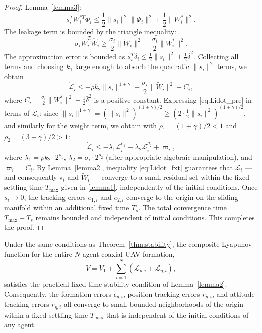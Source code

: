\begin{proof}
Lemma~\ref{lemma3}:
\begin{equation}
    s_i^T W_i^{*T} \Phi_i \leq \frac{1}{2}\|s_i\|^2 \|\Phi_i\|^2
    + \frac{1}{2}\|W_i^*\|^2.
    \label{eq:young_nn}
\end{equation}
The leakage term is bounded by the triangle inequality:
\begin{equation}
    \sigma_i \tilde{W}_i^T \hat{W}_i
    \geq \frac{\sigma_i}{2}\|\tilde{W}_i\|^2 - \frac{\sigma_i}{2}\|W_i^*\|^2.
    \label{eq:leakage}
\end{equation}
The approximation error is bounded as $s_i^T \delta_i \leq \frac{1}{2}\|s_i\|^2
+ \frac{1}{2}\bar{\delta}^2$. Collecting all terms and choosing $k_1$ large
enough to absorb the quadratic $\|s_i\|^2$ terms, we obtain
\begin{equation}
    \dot{\mathcal{L}}_i \leq
    -\underline{\rho} k_2 \|s_i\|^{1+\gamma}
    - \frac{\sigma_i}{2}\|\tilde{W}_i\|^2 + C_i,
    \label{eq:Lidot_pre}
\end{equation}
where $C_i = \frac{\sigma_i}{2}\|W_i^*\|^2 + \frac{1}{2}\bar{\delta}^2$ is a
positive constant. Expressing \eqref{eq:Lidot_pre} in terms of $\mathcal{L}_i$:
since $\|s_i\|^{1+\gamma} = (\|s_i\|^2)^{(1+\gamma)/2} \geq
(2 \cdot \frac{1}{2}\|s_i\|^2)^{(1+\gamma)/2}$, and similarly for the weight
term, we obtain with $\rho_1 = (1+\gamma)/2 < 1$ and $\rho_2 = (3-\gamma)/2 > 1$:
\begin{equation}
    \dot{\mathcal{L}}_i \leq
    -\lambda_1 \mathcal{L}_i^{\rho_1}
    - \lambda_2 \mathcal{L}_i^{\rho_2} + \varpi_i,
    \label{eq:Lidot_fxt}
\end{equation}
where $\lambda_1 = \underline{\rho} k_2 \cdot 2^{\rho_1}$,
$\lambda_2 = \sigma_i \cdot 2^{\rho_2}$ (after appropriate algebraic
manipulation), and $\varpi_i = C_i$. By Lemma~\ref{lemma2}, inequality
\eqref{eq:Lidot_fxt} guarantees that $\mathcal{L}_i$ — and consequently
$s_i$ and $\tilde{W}_i$ — converge to a small residual set within the fixed
settling time $T_{\max}$ given in \eqref{lemma1}, independently of the initial
conditions. Once $s_i \to 0$, the tracking errors $e_{1,i}$ and $e_{2,i}$
converge to the origin on the sliding manifold within an additional fixed time
$T_s$. The total convergence time $T_{\max} + T_s$ remains bounded and
independent of initial conditions. This completes the proof.
\end{proof}

\begin{theorem}
\label{thm:full_system}
Under the same conditions as Theorem~\ref{thm:stability}, the composite
Lyapunov function for the entire $N$-agent coaxial UAV formation,
\begin{equation}
    V = V_1 + \sum_{i=1}^{N} \left(\mathcal{L}_{p,i} + \mathcal{L}_{\eta,i}\right),
    \label{eq:V_total}
\end{equation}
satisfies the practical fixed-time stability condition of Lemma~\ref{lemma2}.
Consequently, the formation errors $\epsilon_{p,i}$, position tracking errors
$r_{p,i}$, and attitude tracking errors $r_{\eta,i}$ all converge to small
bounded neighborhoods of the origin within a fixed settling time $T_{\max}$
that is independent of the initial conditions of any agent.
\end{theorem}

